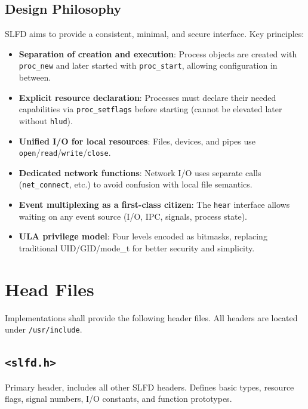 \documentclass[12pt,a4paper]{article}
\begin{document}
\subsection{Design Philosophy}
SLFD aims to provide a consistent, minimal, and secure interface. Key principles:
\begin{itemize}
    \item \textbf{Separation of creation and execution}: Process objects are created with \texttt{proc\_new} and later started with \texttt{proc\_start}, allowing configuration in between.
    \item \textbf{Explicit resource declaration}: Processes must declare their needed capabilities via \texttt{proc\_setflags} before starting (cannot be elevated later without \texttt{hlud}).
    \item \textbf{Unified I/O for local resources}: Files, devices, and pipes use \texttt{open}/\texttt{read}/\texttt{write}/\texttt{close}.
    \item \textbf{Dedicated network functions}: Network I/O uses separate calls (\texttt{net\_connect}, etc.) to avoid confusion with local file semantics.
    \item \textbf{Event multiplexing as a first-class citizen}: The \texttt{hear} interface allows waiting on any event source (I/O, IPC, signals, process state).
    \item \textbf{ULA privilege model}: Four levels encoded as bitmasks, replacing traditional UID/GID/mode\_t for better security and simplicity.
\end{itemize}

\section{Head Files}
Implementations shall provide the following header files. All headers are located under \texttt{/usr/include}.

\subsection[<slfd.h>]{\texorpdfstring{\texttt{<slfd.h>}}{<slfd.h>}}
Primary header, includes all other SLFD headers. Defines basic types, resource flags, signal numbers, I/O constants, and function prototypes.
\end{document}
